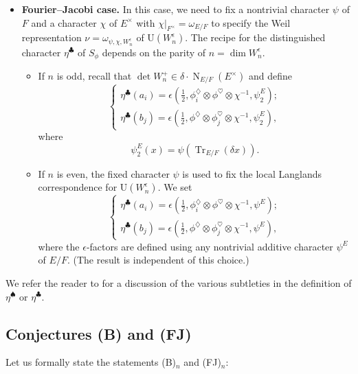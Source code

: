 \documentclass[11pt]{amsart}
\numberwithin{equation}{section}
\theoremstyle{plain}
\theoremstyle{definition}
\theoremstyle{remark}
\def\N{\operatorname{N}}
\def\Tr{\operatorname{Tr}}
\def\U{\mathrm{U}}
\begin{document}
\begin{itemize}
\item \textbf{Fourier--Jacobi case.}
In this case, we need to fix a nontrivial character $\psi$ of $F$ and a character $\chi$ of $E^{\times}$ with $\chi|_{F^{\times}} = \omega_{E/F}$ to specify the Weil representation $\nu = \omega_{\psi,\chi, W_n^\epsilon}$ of $\U(W_n^\epsilon)$.
The recipe for the distinguished character $\eta^{\clubsuit}$ of $S_{\phi}$ depends on the parity of $n = \dim W_n^\epsilon$.
\begin{itemize}
\item If $n$ is odd, recall that $\det W^+_n  \in  \delta \cdot \N_{E/F}(E^{\times})$ and define
\[ \begin{cases}
 \eta^{\clubsuit}(a_i) = \epsilon(\frac{1}{2}, \phi^{\diamondsuit}_{i} \otimes \phi^{\heartsuit} \otimes \chi^{-1},  \psi_2^E);  \\
  \eta^{\clubsuit}(b_j)  = \epsilon(\frac{1}{2}, \phi^{\diamondsuit} \otimes \phi^{\heartsuit}_{j} \otimes \chi^{-1}, \psi_2^E), \end{cases} \]
  where
  \[  \psi^E_2(x)  = \psi(\Tr_{E/F}(\delta x)).  \]
\item If $n$ is even, the fixed character $\psi$  is used to fix the local Langlands correspondence for $\U(W_n^\epsilon)$.
 We set
\[  \begin{cases}
\eta^{\clubsuit}(a_i) = \epsilon(\frac{1}{2}, \phi^{\diamondsuit}_i \otimes \phi^{\heartsuit} \otimes \chi^{-1},  \psi^E); \\
  \eta^{\clubsuit}(b_j)  = \epsilon(\frac{1}{2}, \phi^{\diamondsuit} \otimes \phi^{\heartsuit}_{j} \otimes \chi^{-1}, \psi^E), \end{cases} \]
where the $\epsilon$-factors are defined using any nontrivial additive character $\psi^E$ of $E/F$.
(The result is independent of this choice.)
\end{itemize}
\end{itemize}

We refer the reader to \cite[\S 18]{ggp1} for a discussion of the various subtleties in the definition of $\eta^{\spadesuit}$ or $\eta^{\clubsuit}$.

\subsection{Conjectures (B) and (FJ)}

Let us formally state the statements (B)$_n$ and (FJ)$_n$:
\end{document}
